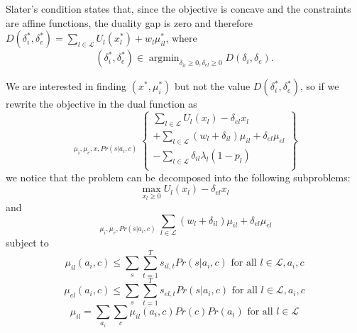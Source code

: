 \documentclass[conference]{IEEEtran}
\begin{document}
Slater's condition \cite{Boyd04} states that, since the objective is concave and the constraints are affine functions, the duality gap is zero and therefore $D(\delta_i^*, \delta_e^*)=\sum\limits_{l \in \mathcal{L}} U_l(x_l^*) + w_l \mu_{il}^*$, where
\begin{equation*}
	(\delta_i^*, \delta_e^*) \in \mathop{\arg\min}_{\delta_{il} \geq 0, \delta_{el} \geq 0} D(\delta_i, \delta_e).
\end{equation*}

We are interested in finding $(x^*, \mu_i^*)$ but not the value $D(\delta_i^*, \delta_e^*)$, so if we rewrite the objective in the dual function as
\begin{equation*}
	\mathop{ \max\limits_{ \mu_{i}(a_i,c), \mu_{e}(a_i,c), } }\limits_{ \mu_{i}, \mu_{e}, x, Pr(s | a_i, c) } \left\{ \begin{array}{l} \sum\limits_{l \in \mathcal{L}} U_l(x_l) - \delta_{el} x_l \\ + \sum\limits_{l \in \mathcal{L}} (w_l+\delta_{il}) \mu_{il} + \delta_{el} \mu_{el} \\ - \sum\limits_{l \in \mathcal{L}} \delta_{il} \lambda_l(1-p_l) \\ \end{array} \right\}
\end{equation*}
we notice that the problem can be decomposed into the following subproblems:
\begin{equation*}
	\max\limits_{ x_l \geq 0 } U_l(x_l) - \delta_{el} x_l
\end{equation*}
and
\begin{equation}
\label{first_decomposition_kc}
	\mathop{ \max\limits_{ \mu_{i}(a_i,c), \mu_{e}(a_i,c), } }\limits_{ \mu_{i}, \mu_{e}, Pr(s | a_i, c) } \sum\limits_{l \in \mathcal{L}} (w_l+\delta_{il}) \mu_{il} + \delta_{el} \mu_{el}
\end{equation}
subject to
\begin{equation*}
 \mu_{il}(a_i,c) \leq \sum\limits_{s} \sum_{t=1}^{T} s_{il,t} Pr(s | a_i, c) \mbox{ for all } l \in \mathcal{L}, a_i, c
\end{equation*}
\begin{equation*}
 \mu_{el}(a_i,c) \leq \sum\limits_{s} \sum_{t=1}^{T} s_{el,t} Pr(s | a_i, c) \mbox{ for all } l \in \mathcal{L}, a_i, c
\end{equation*}
\begin{equation*}
	\mu_{il} = \sum\limits_{a_i} \sum\limits_{c} \mu_{il}(a_i,c) Pr(c) Pr(a_i) \mbox{ for all } l \in \mathcal{L}
\end{equation*}
\end{document}
